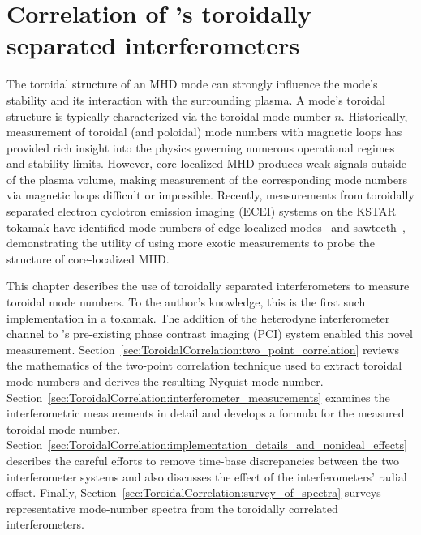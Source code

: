 \chapter{Correlation of \diiid's toroidally separated interferometers}
\label{ch:ToroidalCorrelation}
\graffito{\textcolor{red}{rephrase}}
The toroidal structure of an MHD mode can strongly influence
the mode's stability and its interaction with the surrounding plasma.
A mode's toroidal structure is typically characterized
via the toroidal mode number $n$.
Historically, measurement of toroidal (and poloidal) mode numbers
with magnetic loops has provided rich insight
into the physics governing numerous operational regimes and stability limits.
However, core-localized MHD produces weak signals outside of the plasma volume,
making measurement of the corresponding mode numbers
via magnetic loops difficult or impossible.
Recently, measurements from toroidally separated
electron cyclotron emission imaging (ECEI) systems
on the KSTAR tokamak have identified mode numbers of
edge-localized modes~\cite{lee_rsi_2014} and
sawteeth~\cite{choe_nf_2015},
demonstrating the utility of using more exotic measurements
to probe the structure of core-localized MHD.

This chapter describes the use of toroidally separated interferometers
to measure toroidal mode numbers.
To the author's knowledge, this is the first such implementation in a tokamak.
The addition of the heterodyne interferometer channel
to \diiid's pre-existing phase contrast imaging (PCI) system
enabled this novel measurement.
Section~\ref{sec:ToroidalCorrelation:two_point_correlation}
reviews the mathematics of the two-point correlation technique
used to extract toroidal mode numbers and
derives the resulting Nyquist mode number.
Section~\ref{sec:ToroidalCorrelation:interferometer_measurements}
examines the interferometric measurements in detail and
develops a formula for the measured toroidal mode number.
Section~\ref{sec:ToroidalCorrelation:implementation_details_and_nonideal_effects}
describes the careful efforts to remove time-base discrepancies
between the two interferometer systems and
also discusses the effect of the interferometers' radial offset.
Finally, Section~\ref{sec:ToroidalCorrelation:survey_of_spectra}
surveys representative mode-number spectra
from the toroidally correlated interferometers.


